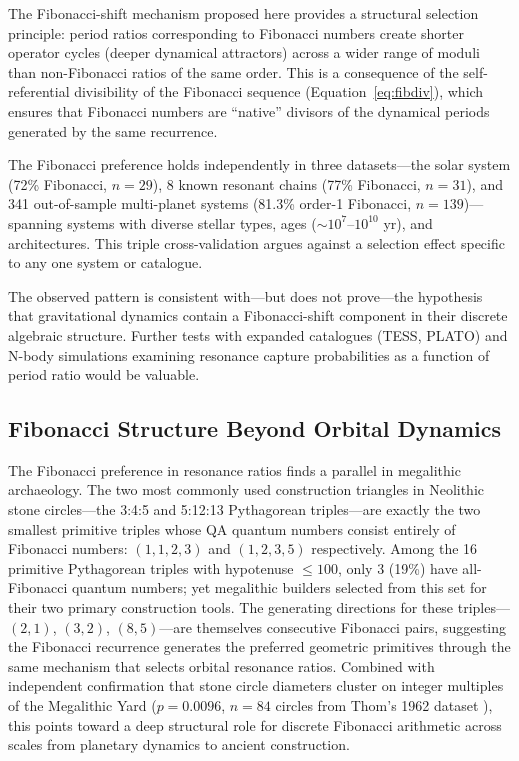 \documentclass[twocolumn,11pt]{article}
\begin{document}
The Fibonacci-shift mechanism proposed here provides a structural
selection principle: period ratios corresponding to Fibonacci numbers
create shorter operator cycles (deeper dynamical attractors) across a
wider range of moduli than non-Fibonacci ratios of the same order.
This is a consequence of the self-referential divisibility of the
Fibonacci sequence (Equation~\ref{eq:fibdiv}), which ensures that
Fibonacci numbers are ``native'' divisors of the dynamical periods
generated by the same recurrence.

The Fibonacci preference holds independently in three datasets---the
solar system (72\% Fibonacci, $n = 29$), 8 known resonant chains
(77\% Fibonacci, $n = 31$), and 341 out-of-sample multi-planet
systems (81.3\% order-1 Fibonacci, $n = 139$)---spanning systems with
diverse stellar types, ages ($\sim 10^7$--$10^{10}$ yr), and
architectures.  This triple cross-validation argues against a
selection effect specific to any one system or catalogue.

The observed pattern is consistent with---but does not prove---the
hypothesis that gravitational dynamics contain a Fibonacci-shift
component in their discrete algebraic structure.  Further tests with
expanded catalogues (TESS, PLATO) and N-body simulations examining
resonance capture probabilities as a function of period ratio would
be valuable.

\subsection{Fibonacci Structure Beyond Orbital Dynamics}

The Fibonacci preference in resonance ratios finds a parallel in
megalithic archaeology.  The two most commonly used construction
triangles in Neolithic stone circles---the 3:4:5 and 5:12:13
Pythagorean triples---are exactly the two smallest primitive triples
whose QA quantum numbers consist entirely of Fibonacci numbers:
$(1,1,2,3)$ and $(1,2,3,5)$ respectively.  Among the 16 primitive
Pythagorean triples with hypotenuse $\leq 100$, only 3 (19\%) have
all-Fibonacci quantum numbers; yet megalithic builders selected from
this set for their two primary construction tools.  The generating
directions for these triples---$(2,1)$, $(3,2)$, $(8,5)$---are
themselves consecutive Fibonacci pairs, suggesting the Fibonacci
recurrence generates the preferred geometric primitives through the
same mechanism that selects orbital resonance ratios.  Combined with
independent confirmation that stone circle diameters cluster on
integer multiples of the Megalithic Yard ($p = 0.0096$, $n = 84$
circles from Thom's 1962 dataset \citep{thom1962}), this points
toward a deep structural role for discrete Fibonacci arithmetic
across scales from planetary dynamics to ancient construction.
\end{document}
